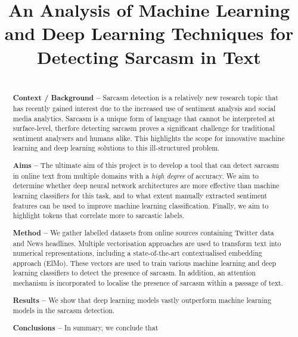 \documentclass[12pt,a4paper]{article}
\title{An Analysis of Machine Learning and Deep Learning Techniques for Detecting Sarcasm in Text}
\author{} %
\date{}
\begin{document}
	
\maketitle

\begin{abstract}
\\ \noindent \textbf{Context / Background --} 
Sarcasm detection is a relatively new research topic that has recently gained interest due to the increased use of sentiment analysis and social media analytics. Sarcasm is a unique form of language that cannot be interpreted at surface-level, therfore detecting sarcasm proves a significant challenge for traditional sentiment analysers and humans alike. This highlights the scope for innovative machine learning and deep learning solutions to this ill-structured problem.\vspace{5pt}

\noindent \textbf{Aims --} The ultimate aim of this project is to develop a tool that can detect sarcasm in online text from multiple domains with a \textit{high degree} of accuracy. We aim to determine whether deep neural network architectures are more effective than machine learning classifiers for this task, and to what extent manually extracted sentiment features can be used to improve machine learning classification. Finally, we aim to highlight tokens that correlate more to sarcastic labels.\vspace{5pt}

\noindent \textbf{Method --} We gather labelled datasets from online sources containing Twitter data and News headlines. Multiple vectorisation approaches are used to transform text into numerical representations, including a state-of-the-art contextualised embedding approach (ElMo). These vectors are used to train various machine learning and deep learning classifiers to detect the presence of sarcasm. In addition, an attention mechanism is incorporated to localise the presence of sarcasm within a passage of text.\vspace{5pt}

\noindent \textbf{Results --} We show that deep learning models vastly outperform machine learning models in the sarcasm detection.\vspace{5pt}

\noindent \textbf{Conclusions --} In summary, we conclude that

\end{abstract}
\end{document}
